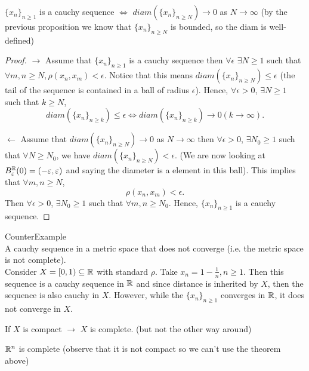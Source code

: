 \documentclass[a4paper]{article}
\begin{document}
\begin{prop}
  $\{x_n\}_{n \geq 1} $ is a cauchy sequence $\iff$ $diam\left( \{x_n\}_{n \geq N}  \right) \to 0$ as $N \to \infty$ (by the previous proposition we know that $\{x_n\}_{n \geq N} $ is bounded, so the diam is well-defined)  

  \begin{proof}
    $\to$ Assume that  $\{x_n\}_{n \geq 1} $ is a cauchy sequence then $\forall \epsilon$  $\exists N \geq 1$ such that $\forall m,n \geq N, \rho(x_n,x_m) < \epsilon$. Notice that this means $diam(\{x_n\}_{n \geq N}) \leq \epsilon$ (the tail of the sequence is contained in a ball of radius $\epsilon$). Hence,  $\forall \epsilon > 0$,  $\exists  N \geq 1$ such that $k \geq N$,
    \[
    diam\left( \{x_n\}_{n \geq k}  \right) \leq \epsilon \iff diam\left( \{x_n\}_{n \geq k}  \right) \to 0 (k \to \infty) 
    .\] 

    $\leftarrow$ Assume that $diam\left( \{x_n\}_{n \geq N}  \right) \to 0$ as $N \to \infty$ then $\forall \epsilon > 0$, $\exists N_0 \geq 1$ such that $\forall N \geq N_0$, we have  $diam(\{x_n\}_{n \geq N}) < \epsilon $. (We are now looking at $B_\varepsilon^{\mathbb{R}}(0) = (-\varepsilon, \varepsilon)$ and saying the diameter is a element in this ball). This implies that $\forall m,n \geq N$, 
    \[
    \rho(x_n, x_m) < \epsilon
    .\] 
    Then $\forall \epsilon > 0$,  $\exists N_0 \geq 1$ such that $\forall m,n \geq N_0$. Hence, $\{x_n\}_{n \geq 1} $ is a cauchy sequence.   
  \end{proof}
\end{prop}

\begin{note}{CounterExample}\\
  A cauchy sequence in a metric space that does not converge (i.e. the metric space is not complete).\\


  Consider $X = [0,1) \subseteq \mathbb{R}$ with standard $\rho$. Take  $x_n = 1 - \frac{1}{n}, n \geq 1$. Then this sequence is a cauchy sequence in $\mathbb{R}$ and since distance is inherited by $X$, then  the sequence is also cauchy in  $X$. However, while the $\{x_n\}_{n \geq 1} $ converges in  $\mathbb{R}$, it does not converge in $X$.   
\end{note}


\begin{theorem}
  If $X$ is compact  $\to$  $X$ is complete. (but not the other way around)
\end{theorem}

\begin{theorem}
  $\mathbb{R}^{n}$ is complete (observe that it is not compact so we can't use the theorem above)
\end{theorem}
\end{document}
